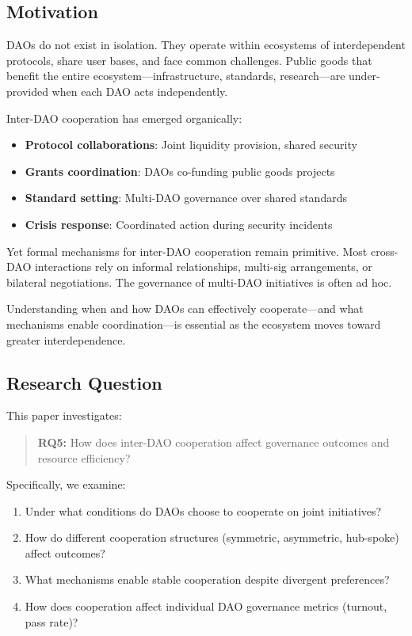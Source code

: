 
\subsection{Motivation}

DAOs do not exist in isolation. They operate within ecosystems of interdependent protocols, share user bases, and face common challenges. Public goods that benefit the entire ecosystem---infrastructure, standards, research---are under-provided when each DAO acts independently.

Inter-DAO cooperation has emerged organically:
\begin{itemize}
    \item \textbf{Protocol collaborations}: Joint liquidity provision, shared security
    \item \textbf{Grants coordination}: DAOs co-funding public goods projects
    \item \textbf{Standard setting}: Multi-DAO governance over shared standards
    \item \textbf{Crisis response}: Coordinated action during security incidents
\end{itemize}

Yet formal mechanisms for inter-DAO cooperation remain primitive. Most cross-DAO interactions rely on informal relationships, multi-sig arrangements, or bilateral negotiations. The governance of multi-DAO initiatives is often ad hoc.

Understanding when and how DAOs can effectively cooperate---and what mechanisms enable coordination---is essential as the ecosystem moves toward greater interdependence.

\subsection{Research Question}

This paper investigates:

\begin{quote}
\textbf{RQ5:} How does inter-DAO cooperation affect governance outcomes and resource efficiency?
\end{quote}

Specifically, we examine:
\begin{enumerate}
    \item Under what conditions do DAOs choose to cooperate on joint initiatives?
    \item How do different cooperation structures (symmetric, asymmetric, hub-spoke) affect outcomes?
    \item What mechanisms enable stable cooperation despite divergent preferences?
    \item How does cooperation affect individual DAO governance metrics (turnout, pass rate)?
\end{enumerate}

